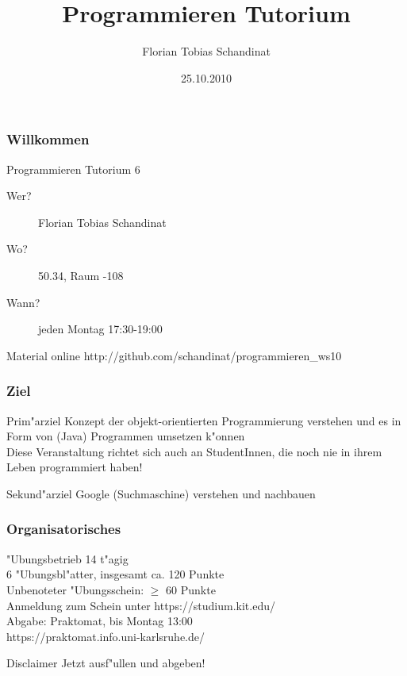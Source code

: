 \documentclass{beamer}
\title{Programmieren Tutorium}
\author{Florian Tobias Schandinat}
\date{25.10.2010}
\institute{}
\begin{document}
\begin{frame}
\frametitle{Willkommen}
\begin{block}{Programmieren Tutorium 6}
\begin{description}
\item[Wer?] Florian Tobias Schandinat\\
\item[Wo?] 50.34, Raum -108\\
\item[Wann?] jeden Montag 17:30-19:00
\end{description}
\end{block}

\begin{block}{Material online}
http://github.com/schandinat/programmieren\_ws10
\end{block}
\end{frame}


\begin{frame}
\frametitle{Ziel}
\begin{block}{Prim"arziel}
Konzept der objekt-orientierten Programmierung verstehen und es in Form von (Java) Programmen umsetzen k"onnen\\[1em]
Diese Veranstaltung richtet sich auch an StudentInnen, die noch nie in ihrem Leben programmiert haben!
\end{block}

\pause

\begin{block}{Sekund"arziel}
Google (Suchmaschine) verstehen und nachbauen
\end{block}
\end{frame}


\begin{frame}
\frametitle{Organisatorisches}
\begin{block}{"Ubungsbetrieb}
14 t"agig\\
6 "Ubungsbl"atter, insgesamt ca. 120 Punkte\\
Unbenoteter "Ubungsschein: $\ge$ 60 Punkte\\
Anmeldung zum Schein unter https://studium.kit.edu/\\
Abgabe: \alert{Praktomat, bis Montag 13:00}\\
https://praktomat.info.uni-karlsruhe.de/
\end{block}

\pause

\begin{block}{Disclaimer}
\alert{Jetzt ausf"ullen und abgeben!}
\end{block}
\end{frame}
\end{document}
